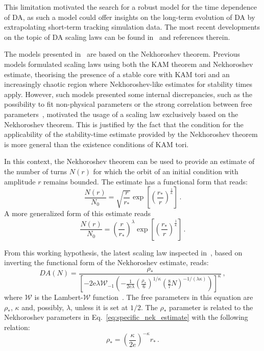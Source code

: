 This limitation motivated the search for a robust model for the time dependence of DA, as such a model could offer insights on the long-term evolution of DA by extrapolating short-term tracking simulation data. The most recent developments on the topic of DA scaling laws can be found in~\cite{Bazzani:2019csk} and references therein.

The models presented in~\cite{Bazzani:2019csk} are based on the Nekhoroshev theorem. Previous models formulated scaling laws using both the KAM theorem and Nekhoroshev estimate, theorising the presence of a stable core with KAM tori and an increasingly chaotic region where Nekhoroshev-like estimates for stability times apply. However, such models presented some internal discrepancies, such as the possibility to fit non-physical parameters or the strong correlation between free parameters~\cite{Giovannozzi:2018wmm,Giovannozzi:2018igq}, motivated the usage of a scaling law exclusively based on the Nekhoroshev theorem. This is justified by the fact that the condition for the applicability of the stability-time estimate provided by the Nekhoroshev theorem is more general than the existence conditions of KAM tori.

In this context, the Nekhoroshev theorem can be used to provide an estimate of the number of turns $N(r)$ for which the orbit of an initial condition with amplitude $r$ remains bounded. The estimate has a functional form that reads:
\begin{equation}
    \frac{N(r)}{N_0} = \sqrt{\frac{r}{r_\ast}} \exp\left[\left(\frac{r_\ast}{r}\right)^{\frac{1}{\kappa}}\right]\,.
    \label{eq:specific_nek_estimate}
\end{equation}
A more generalized form of this estimate reads
\begin{equation}
    \frac{N(r)}{N_0} = \left(\frac{r}{r_\ast}\right)^{\lambda} \exp\left[\left(\frac{r_\ast}{r}\right)^{\frac{1}{\kappa}}\right]\,.
\end{equation}

From this working hypothesis, the latest scaling law inspected in~\cite{Bazzani:2019csk}, based on inverting the functional form of the Nekhoroshev estimate, reads:
\begin{equation}
	DA(N) = \frac{\rho_\ast}{\left[-2 \mathrm{e} \lambda \mathcal{W}_{-1}\left(-\frac{1}{2 \mathrm{e} \lambda}\left(\frac{\rho_*}{6}\right)^{1 / \kappa}\left(\frac{8}{7} N\right)^{-1 /(\lambda \kappa)}\right)\right]^\kappa}\,,
	\label{eq:giova_interpolation}
\end{equation}
where $\mathcal{W}$ is the Lambert-$\mathcal{W}$ function~\cite{Corless1996}. The free parameters in this equation are $\rho_\ast$, $\kappa$ and, possibly, $\lambda$, unless it is set at $1/2$. The $\rho_\ast$ parameter is related to the Nekhoroshev parameters in Eq.~\eqref{eq:specific_nek_estimate} with the following relation:
\begin{equation}
    \rho_\ast = \left(\frac{\kappa}{2e}\right)^{-\kappa} r_\ast \,.
\end{equation}

